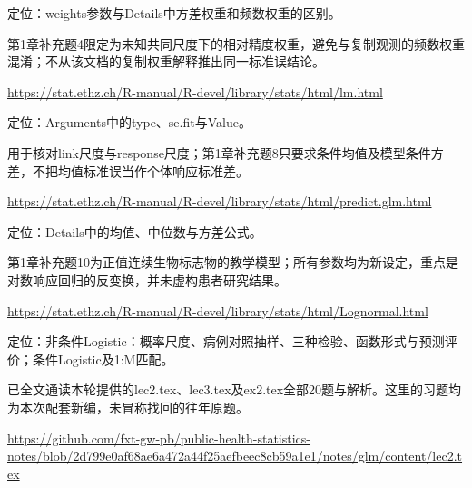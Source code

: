 \par\noindent\begin{minipage}{\linewidth}\raggedright{}\label{src:G1-LM}
\par
定位：weights参数与Details中方差权重和频数权重的区别。\par
第1章补充题4限定为未知共同尺度下的相对精度权重，避免与复制观测的频数权重混淆；不从该文档的复制权重解释推出同一标准误结论。\par
{\small \url{https://stat.ethz.ch/R-manual/R-devel/library/stats/html/lm.html}}\par
\end{minipage}\par\medskip

\par\noindent\begin{minipage}{\linewidth}\raggedright{}\label{src:G1-PREDICT}
\par
定位：Arguments中的type、se.fit与Value。\par
用于核对link尺度与response尺度；第1章补充题8只要求条件均值及模型条件方差，不把均值标准误当作个体响应标准差。\par
{\small \url{https://stat.ethz.ch/R-manual/R-devel/library/stats/html/predict.glm.html}}\par
\end{minipage}\par\medskip

\par\noindent\begin{minipage}{\linewidth}\raggedright{}\label{src:G1-LOGNORMAL}
\par
定位：Details中的均值、中位数与方差公式。\par
第1章补充题10为正值连续生物标志物的教学模型；所有参数均为新设定，重点是对数响应回归的反变换，并未虚构患者研究结果。\par
{\small \url{https://stat.ethz.ch/R-manual/R-devel/library/stats/html/Lognormal.html}}\par
\end{minipage}\par\medskip

\par\noindent\begin{minipage}{\linewidth}\raggedright{}\label{src:G2-NOTE}
\par
定位：非条件Logistic：概率尺度、病例对照抽样、三种检验、函数形式与预测评价；条件Logistic及1:M匹配。\par
已全文通读本轮提供的lec2.tex、lec3.tex及ex2.tex全部20题与解析。这里的习题均为本次配套新编，未冒称找回的往年原题。\par
{\small \url{https://github.com/fxt-gw-pb/public-health-statistics-notes/blob/2d799e0af68ae6a472a44f25aefbeec8cb59a1e1/notes/glm/content/lec2.tex}}\par
\end{minipage}\par\medskip

